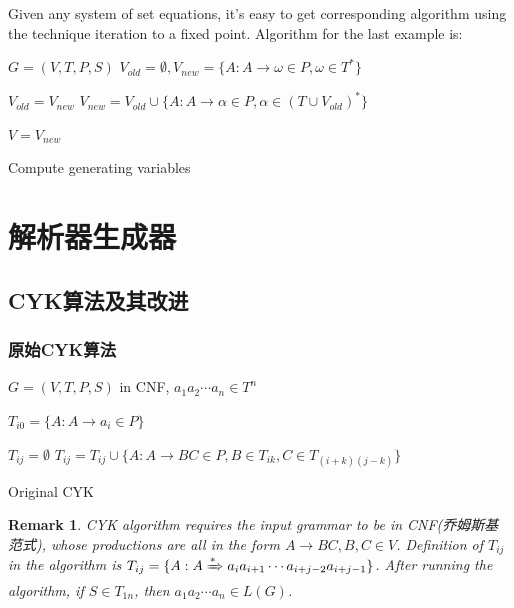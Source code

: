 \documentclass{beamer}
\newtheorem{remark}[theorem]{Remark}
\begin{document}
\begin{frame}
Given any system of set equations, it's easy to get corresponding algorithm using the technique iteration to a fixed point. Algorithm for the last example is:
\begin{algorithm}[H]
\begin{algorithmic}[1]

\REQUIRE $G=(V,T,P,S)$
\ENSURE $V_{old}=\emptyset, V_{new}=\{ A:A\to\omega\in P,\omega\in T^* \}$

\STATE $V_{old}=V_{new}$
\STATE $V_{new}=V_{old}\cup\{ A:A\to\alpha\in P, \alpha\in(T\cup V_{old})^* \}$
\ENDWHILE

\STATE $V=V_{new}$

\end{algorithmic}
\caption{Compute generating variables}
\label{alg:generating}
\end{algorithm}
\end{frame}

\section{解析器生成器}
\subsection{CYK算法及其改进}
\begin{frame}
\frametitle{原始CYK算法}
\begin{algorithm}[H]
\begin{algorithmic}[1]

\REQUIRE $G=(V,T,P,S)$ in CNF, $a_1a_2\cdots a_n\in T^n$

\STATE $ T_{i0}=\{ A:A\to a_i\in P \} $
\ENDFOR

		\STATE $ T_{ij}=\emptyset $
			\STATE $ T_{ij}=T_{ij}\cup\{ A:A\to BC\in P, B\in T_{ik}, C\in T_{(i+k)(j-k)} \} $
		\ENDFOR
	\ENDFOR
\ENDFOR

\end{algorithmic}
\caption{Original CYK}
\label{alg:original_cyk}
\end{algorithm}
\end{frame}

\begin{frame}
\begin{remark}
CYK algorithm requires the input grammar to be in CNF(乔姆斯基范式), whose productions are all in the form $A\to BC, B, C\in V$. Definition of $T_{ij}$ in the algorithm is $T_{ij}=\{ A: A\xRightarrow[]{*}a_ia_{i+1}\cdots a_{i+j-2}a_{i+j-1} \}$. After running the algorithm, if $S\in T_{1n}$, then $a_1a_2\cdots a_n\in L(G)$.
\end{remark}
\end{frame}
\end{document}
